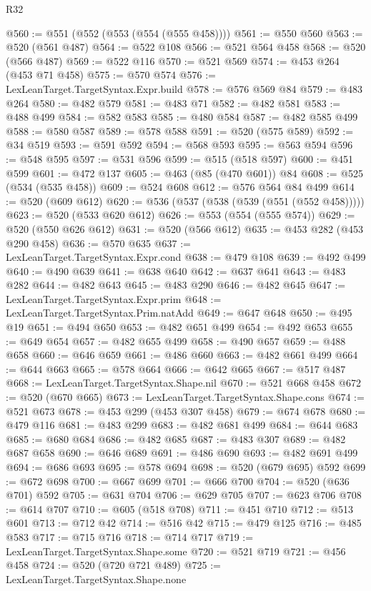 \begin{lexlean}{R32}
\begin{coremodule}
@560 := @551 (@552 (@553 (@554 (@555 @458))))
@561 := @550 @560
@563 := @520 (@561 @487)
@564 := @522 @108
@566 := @521 @564 @458
@568 := @520 (@566 @487)
@569 := @522 @116
@570 := @521 @569
@574 := @453 @264 (@453 @71 @458)
@575 := @570 @574
@576 := LexLeanTarget.TargetSyntax.Expr.build
@578 := @576 @569 @84
@579 := @483 @264
@580 := @482 @579
@581 := @483 @71
@582 := @482 @581
@583 := @488 @499
@584 := @582 @583
@585 := @480 @584
@587 := @482 @585 @499
@588 := @580 @587
@589 := @578 @588
@591 := @520 (@575 @589)
@592 := @34 @519
@593 := @591 @592
@594 := @568 @593
@595 := @563 @594
@596 := @548 @595
@597 := @531 @596
@599 := @515 (@518 @597)
@600 := @451 @599
@601 := @472 @137
@605 := @463 (@85 (@470 @601)) @84
@608 := @525 (@534 (@535 @458))
@609 := @524 @608
@612 := @576 @564 @84 @499
@614 := @520 (@609 @612)
@620 := @536 (@537 (@538 (@539 (@551 (@552 @458)))))
@623 := @520 (@533 @620 @612)
@626 := @553 (@554 (@555 @574))
@629 := @520 (@550 @626 @612)
@631 := @520 (@566 @612)
@635 := @453 @282 (@453 @290 @458)
@636 := @570 @635
@637 := LexLeanTarget.TargetSyntax.Expr.cond
@638 := @479 @108
@639 := @492 @499
@640 := @490 @639
@641 := @638 @640
@642 := @637 @641
@643 := @483 @282
@644 := @482 @643
@645 := @483 @290
@646 := @482 @645
@647 := LexLeanTarget.TargetSyntax.Expr.prim
@648 := LexLeanTarget.TargetSyntax.Prim.natAdd
@649 := @647 @648
@650 := @495 @19
@651 := @494 @650
@653 := @482 @651 @499
@654 := @492 @653
@655 := @649 @654
@657 := @482 @655 @499
@658 := @490 @657
@659 := @488 @658
@660 := @646 @659
@661 := @486 @660
@663 := @482 @661 @499
@664 := @644 @663
@665 := @578 @664
@666 := @642 @665
@667 := @517 @487
@668 := LexLeanTarget.TargetSyntax.Shape.nil
@670 := @521 @668 @458
@672 := @520 (@670 @665)
@673 := LexLeanTarget.TargetSyntax.Shape.cons
@674 := @521 @673
@678 := @453 @299 (@453 @307 @458)
@679 := @674 @678
@680 := @479 @116
@681 := @483 @299
@683 := @482 @681 @499
@684 := @644 @683
@685 := @680 @684
@686 := @482 @685
@687 := @483 @307
@689 := @482 @687 @658
@690 := @646 @689
@691 := @486 @690
@693 := @482 @691 @499
@694 := @686 @693
@695 := @578 @694
@698 := @520 (@679 @695) @592
@699 := @672 @698
@700 := @667 @699
@701 := @666 @700
@704 := @520 (@636 @701) @592
@705 := @631 @704
@706 := @629 @705
@707 := @623 @706
@708 := @614 @707
@710 := @605 (@518 @708)
@711 := @451 @710
@712 := @513 @601
@713 := @712 @42
@714 := @516 @42
@715 := @479 @125
@716 := @485 @583
@717 := @715 @716
@718 := @714 @717
@719 := LexLeanTarget.TargetSyntax.Shape.some
@720 := @521 @719
@721 := @456 @458
@724 := @520 (@720 @721 @489)
@725 := LexLeanTarget.TargetSyntax.Shape.none

\end{coremodule}
\end{lexlean}
